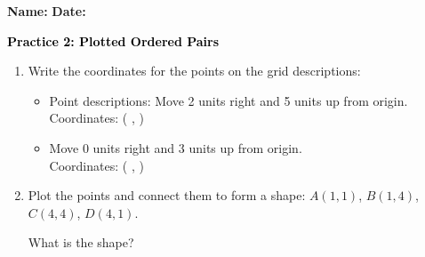 \documentclass[12pt, letterpaper, fleqn]{article}
\newcommand{\blank}{\underline{\hspace{2.2cm}}}
\newcommand{\blanklong}{\underline{\hspace{6.5cm}}}
\begin{document}
\textbf{Name:} \underline{\hspace{5cm}}
\hfill
\textbf{Date:} \underline{\hspace{3cm}}\\

\begin{tcolorbox}[colback=customteal!20]
    \large\textcolor{black}{\textbf{Practice 2: Plotted Ordered Pairs}}
\end{tcolorbox}

\vspace{5mm}
\begin{enumerate}[itemsep=3cm, leftmargin=0.6cm]
\item Write the coordinates for the points on the grid descriptions:
  \begin{itemize}[itemsep=1cm]
    \item Point descriptions: Move 2 units right and 5 units up from origin. \\ Coordinates: ( \blank, \blank )
    \item Move 0 units right and 3 units up from origin. \\ Coordinates: ( \blank, \blank )
  \end{itemize}

\item Plot the points and connect them to form a shape: $A(1,1)$, $B(1,4)$, $C(4,4)$, $D(4,1)$.
\begin{center}
\end{center}
What is the shape? \blanklong
\end{enumerate}
\end{document}
